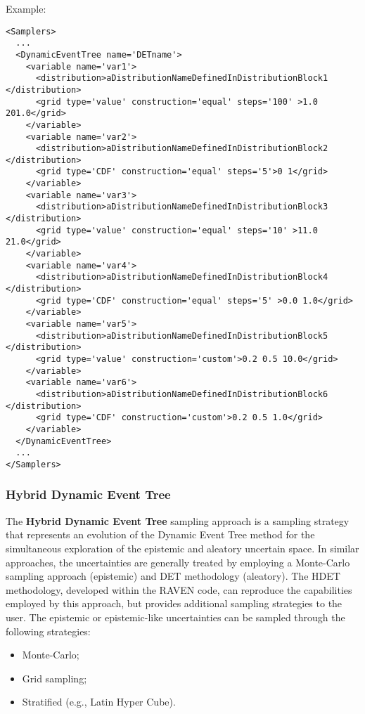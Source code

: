 Example:
\begin{lstlisting}[style=XML]
<Samplers>
  ...
  <DynamicEventTree name='DETname'>
    <variable name='var1'>
      <distribution>aDistributionNameDefinedInDistributionBlock1 </distribution>
      <grid type='value' construction='equal' steps='100' >1.0 201.0</grid>
    </variable>
    <variable name='var2'>
      <distribution>aDistributionNameDefinedInDistributionBlock2 </distribution>
      <grid type='CDF' construction='equal' steps='5'>0 1</grid>
    </variable>
    <variable name='var3'>
      <distribution>aDistributionNameDefinedInDistributionBlock3 </distribution>
      <grid type='value' construction='equal' steps='10' >11.0 21.0</grid>
    </variable>
    <variable name='var4'>
      <distribution>aDistributionNameDefinedInDistributionBlock4 </distribution>
      <grid type='CDF' construction='equal' steps='5' >0.0 1.0</grid>
    </variable>
    <variable name='var5'>
      <distribution>aDistributionNameDefinedInDistributionBlock5 </distribution>
      <grid type='value' construction='custom'>0.2 0.5 10.0</grid>
    </variable>
    <variable name='var6'>
      <distribution>aDistributionNameDefinedInDistributionBlock6 </distribution>
      <grid type='CDF' construction='custom'>0.2 0.5 1.0</grid>
    </variable>
  </DynamicEventTree>
  ...
</Samplers>
\end{lstlisting}

\subsubsection{Hybrid Dynamic Event Tree}
\label{subsubsubsec:HDET}
The \textbf{Hybrid Dynamic Event Tree} sampling approach is a sampling strategy
that represents an evolution of the Dynamic Event Tree method for the
simultaneous exploration of the epistemic and aleatory uncertain space.
%
In similar approaches, the uncertainties are generally treated by employing a
Monte-Carlo sampling approach (epistemic) and DET methodology (aleatory).
%
The HDET methodology, developed within the RAVEN code, can reproduce the
capabilities employed by this approach, but provides additional sampling
strategies to the user.
%
The epistemic or epistemic-like uncertainties can be sampled through the
following strategies:

\begin{itemize}
  \item Monte-Carlo;
  \item Grid sampling;
  \item Stratified (e.g., Latin Hyper Cube).
\end{itemize}

